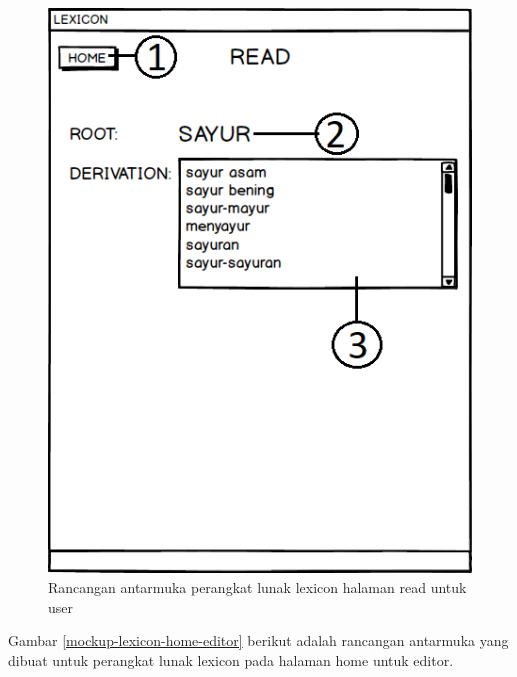 \begin{figure}[H]
\centering
\includegraphics[scale=0.8]{Gambar/mockup-lexicon-read-user}
\caption{Rancangan antarmuka perangkat lunak lexicon halaman read untuk user} 
\label{mockup-lexicon-read-user}
\end{figure}

Gambar \ref{mockup-lexicon-home-editor} berikut adalah rancangan antarmuka yang dibuat untuk perangkat lunak lexicon pada halaman home untuk editor.

